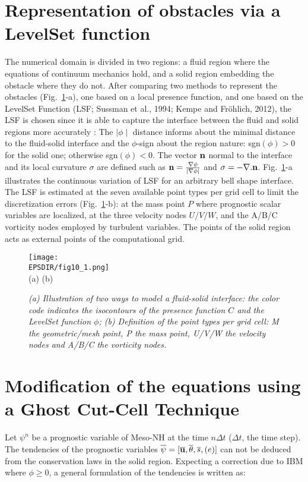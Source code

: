 \section{Representation of obstacles via a LevelSet function}
\label{S_IBM}
%
The numerical domain is divided in two regions: a fluid region where the equations of continuum 
mechanics hold, and a solid region embedding the obstacle where they do not. 
After comparing two methods to represent the obstacles (Fig.~\ref{mesh_nodeX}-a), one
based on a local presence function, and one based on the LevelSet Function (LSF; Sussman et al., 1994; 
Kempe and Fröhlich, 2012), the LSF is chosen since it is able to 
capture the interface between the fluid and solid regions more accurately : 
The $\mid \phi \mid$ distance informs about the minimal distance to the 
fluid-solid interface and the $\phi$-sign about the region nature: sgn$(\phi)>0$ 
for the solid one; otherwise sgn$(\phi) < 0$. The vector ${\bf n}$ normal to 
the interface and its local curvature $\sigma$ are defined such as 
${\bf n} = \frac{\bf \nabla \phi}{\bf |\nabla \phi|}$ and 
$\sigma = -\nabla . {\bf n}$. Fig.~\ref{mesh_nodeX}-a illustrates the 
continuous variation of LSF for an arbitrary bell shape interface. 
The LSF is estimated at the seven available point types per grid cell to limit 
the discretization errors (Fig.~\ref{mesh_nodeX}-b): at the mass point $P$ 
where prognostic scalar variables are localized, at the three velocity 
nodes $U/V/W$, and the A/B/C vorticity nodes employed by turbulent variables. 
The points of the solid region acts as external points of the computational grid.
%
\begin{figure}[!ht]
\begin{center}
	 \texttt{[image: \\EPSDIR/fig10\_1.png]} \\
			\vspace{-1mm}	 	(a) \hspace{5.6cm} (b) 
	\small \caption {{\it (a) Illustration of two ways to model a fluid-solid interface: the color code indicates the isocontours of the presence function $C$ and the LevelSet function $\phi$; (b) Definition of the point types per grid cell: M the geometric/mesh point, P the mass point, U/V/W the velocity nodes and A/B/C the vorticity nodes.}}
\label{mesh_nodeX} 
\end{center}
\end{figure}
%
\section{Modification of the equations using a Ghost Cut-Cell Technique} 
\label{S_GCT}
%
Let $\psi^n$ be a prognostic variable of Meso-NH at the time $n\Delta t$ ($\Delta t$, the time step). The tendencies of the prognostic variables $\overline{\psi}=[\overline{\bf{u}},\overline{\theta},\overline{s},(e)]$ can not be deduced from the conservation laws in the solid region. Expecting a correction due to IBM where $\phi \ge 0$, a general formulation of the tendencies is written as:

